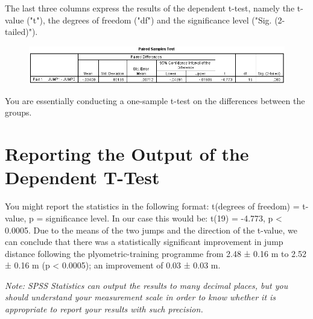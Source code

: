 \documentclass[]{article}
\begin{document}
	The last three columns express the results of the dependent t-test, namely the t-value ("t"), the degrees of freedom ("df") and the significance level ("Sig. (2-tailed)").
	
\begin{figure}[h!]
	\centering
	\includegraphics[width=0.7\linewidth]{Paired/PairedOutput2}
	\caption{}
	\label{fig:PairedOutput2}
\end{figure}

	You are essentially conducting a one-sample t-test on the differences between the groups.
	
\newpage	
\section{Reporting the Output of the Dependent T-Test}
	You might report the statistics in the following format: t(degrees of freedom) = t-value, p = significance level. In our case this would be: t(19) = -4.773, p < 0.0005. Due to the means of the two jumps and the direction of the t-value, we can conclude that there was a statistically significant improvement in jump distance following the plyometric-training programme from 2.48 ± 0.16 m to 2.52 ± 0.16 m (p < 0.0005); an improvement of 0.03 ± 0.03 m.
	
	\begin{framed}
	\textit{
	Note: SPSS Statistics can output the results to many decimal places, but you should understand your measurement scale in order to know whether it is appropriate to report your results with such precision.}
	\end{framed}
	
\end{document}
